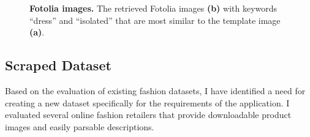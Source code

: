 \documentclass[12pt]{report}
\begin{document}
\begin{figure}[h]
\centering
{}\hspace{1cm}
\caption{\label{fig:fotolia} \textbf{Fotolia images.} The retrieved Fotolia images \textbf{(b)} with keywords ``dress'' and ``isolated'' that are most similar to the template image \textbf{(a)}.}
\end{figure}


\subsection{Scraped Dataset}
Based on the evaluation of existing fashion datasets, I have identified a need for creating a new dataset specifically for the requirements of the application. I evaluated several online fashion retailers that provide downloadable product images and easily parsable descriptions. 
\end{document}
